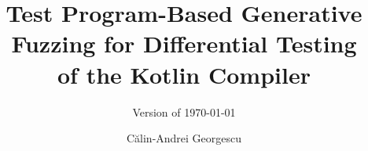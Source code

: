 \documentclass[twoside,a4paper,11pt,openany]{memoir}
\title{Test Program-Based Generative\\ Fuzzing for Differential Testing \\of the Kotlin Compiler}
\subtitle{Version of \today}
\author{C\u alin-Andrei Georgescu}                               %
\begin{document}
\frontmatter
\thispagestyle{empty}
\maketitle                                      %
\makeformaltitlepages{}         %

%

\cleardoublepage\tableofcontents
\cleardoublepage\listoffigures
\cleardoublepage\mainmatter
 
 
 





 




\appendix
\def\chaptername{Appendix}





\end{document}
